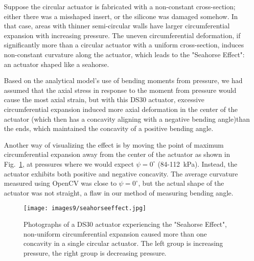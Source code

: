 Suppose the circular actuator is fabricated with a non-constant cross-section; either there was a misshaped insert, or the silicone was damaged somehow. In that case, areas with thinner semi-circular walls have larger circumferential expansion with increasing pressure. The uneven circumferential deformation, if significantly more than a circular actuator with a uniform cross-section, induces non-constant curvature along the actuator, which leads to the "Seahorse Effect": an actuator shaped like a seahorse. 

Based on the analytical model's use of bending moments from pressure, we had assumed that the axial stress in response to the moment from pressure would cause the most axial strain, but with this DS30 actuator, excessive circumferential expansion induced more axial deformation in the center of the actuator (which then has a concavity aligning with a negative bending angle)than the ends, which maintained the concavity of a positive bending angle.  

Another way of visualizing the effect is by moving the point of maximum circumferential expansion away from the center of the actuator as shown in Fig.~\ref{fig:seahorseeffect}, at pressures where we would expect $\psi=0^\circ$ (84-112~kPa). Instead, the actuator exhibits both positive and negative concavity. The average curvature measured using OpenCV was close to $\psi=0^\circ$, but the actual shape of the actuator was not straight, a flaw in our method of measuring bending angle. 

\begin{figure}[ht]
    \centering
     \texttt{[image: images9/seahorseeffect.jpg]}
    \caption{Photographs of a DS30 actuator experiencing the "Seahorse Effect", non-uniform circumferential expansion caused more than one concavity in a single circular actuator. The left group is increasing pressure, the right group is decreasing pressure.}
    \label{fig:seahorseeffect}
\end{figure}

